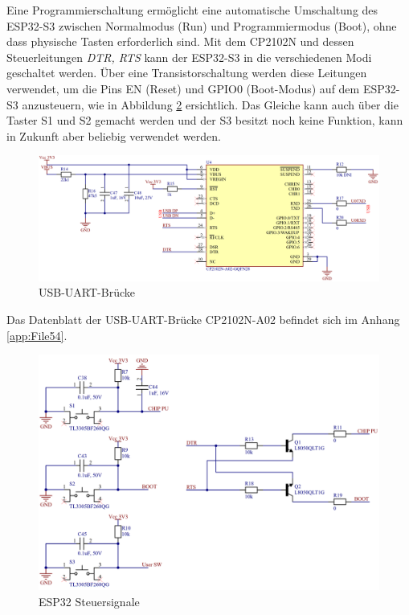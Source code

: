 Eine Programmierschaltung ermöglicht eine automatische Umschaltung des ESP32-S3 zwischen Normalmodus (Run) und Programmiermodus (Boot), ohne dass physische Tasten erforderlich sind. Mit dem CP2102N und dessen Steuerleitungen \textit{DTR, RTS} kann der ESP32-S3 in die verschiedenen Modi geschaltet werden. Über eine Transistorschaltung werden diese Leitungen verwendet, um die Pins EN (Reset) und GPIO0 (Boot-Modus) auf dem ESP32-S3 anzusteuern, wie in Abbildung \ref{fig:ESP32_Steuersignale} ersichtlich. Das Gleiche kann auch über die Taster S1 und S2 gemacht werden und der S3 besitzt noch keine Funktion, kann in Zukunft aber beliebig verwendet werden.

\begin{figure}[H]
    \centering
    \includegraphics[width=1\linewidth]{Figures/Chap3/Schematics/UART_Bridge.png}
    \caption{USB-UART-Brücke}
    \label{fig:UART_Bridge}
\end{figure}

Das Datenblatt der USB-UART-Brücke CP2102N-A02 befindet sich im Anhang \ref{app:File54}.

\begin{figure}[H]
    \centering
    \includegraphics[width=1\linewidth]{Figures/Chap3/Schematics/ESP32_Steuersignale.png}
    \caption{ESP32 Steuersignale}
    \label{fig:ESP32_Steuersignale}
\end{figure}

